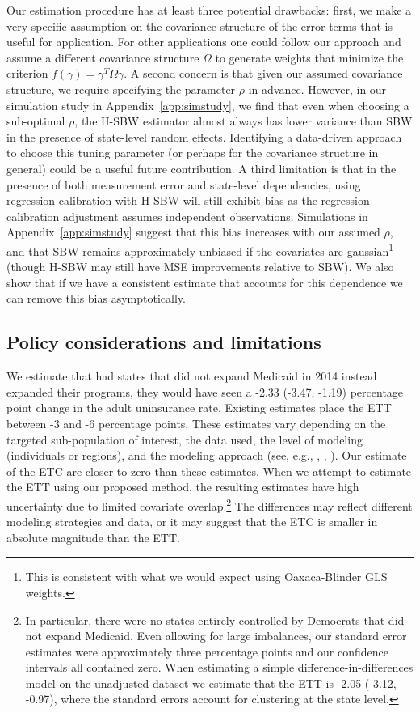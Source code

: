 \documentclass[aoas]{imsart}
\theoremstyle{plain}
\theoremstyle{remark}
\begin{document}
Our estimation procedure has at least three potential drawbacks: first, we make a very specific assumption on the covariance structure of the error terms that is useful for application. For other applications one could follow our approach and assume a different covariance structure $\Omega$ to generate weights that minimize the criterion $f(\gamma) = \gamma^T\Omega\gamma$. A second concern is that given our assumed covariance structure, we require specifying the parameter $\rho$ in advance. However, in our simulation study in Appendix~\ref{app:simstudy}, we find that even when choosing a sub-optimal $\rho$, the H-SBW estimator almost always has lower variance than SBW in the presence of state-level random effects. Identifying a data-driven approach to choose this tuning parameter (or perhaps for the covariance structure in general) could be a useful future contribution. A third limitation is that in the presence of both measurement error and state-level dependencies, using regression-calibration with H-SBW will still exhibit bias as the regression-calibration adjustment assumes independent observations. Simulations in Appendix~\ref{app:simstudy} suggest that this bias increases with our assumed $\rho$, and that SBW remains approximately unbiased if the covariates are gaussian\footnote{This is consistent with what we would expect using Oaxaca-Blinder GLS weights.} (though H-SBW may still have MSE improvements relative to SBW). We also show that if we have a consistent estimate that accounts for this dependence we can remove this bias asymptotically.

\subsection{Policy considerations and limitations}

We estimate that had states that did not expand Medicaid in 2014 instead expanded their programs, they would have seen a -2.33 (-3.47, -1.19) percentage point change in the adult uninsurance rate. Existing estimates place the ETT between -3 and -6 percentage points. These estimates vary depending on the targeted sub-population of interest, the data used, the level of modeling (individuals or regions), and the modeling approach (see, e.g., \cite{courtemanche2017early}, \cite{kaestner2017effects}, \cite{frean2017premium}). Our estimate of the ETC are closer to zero than these estimates. When we attempt to estimate the ETT using our proposed method, the resulting estimates have high uncertainty due to limited covariate overlap.\footnote{In particular, there were no states entirely controlled by Democrats that did not expand Medicaid. Even allowing for large imbalances, our standard error estimates were approximately three percentage points and our confidence intervals all contained zero. When estimating a simple difference-in-differences model on the unadjusted dataset we estimate that the ETT is -2.05 (-3.12, -0.97), where the standard errors account for clustering at the state level.\label{footnote_ett}} The differences may reflect different modeling strategies and data, or it may suggest that the ETC is smaller in absolute magnitude than the ETT.
\end{document}
